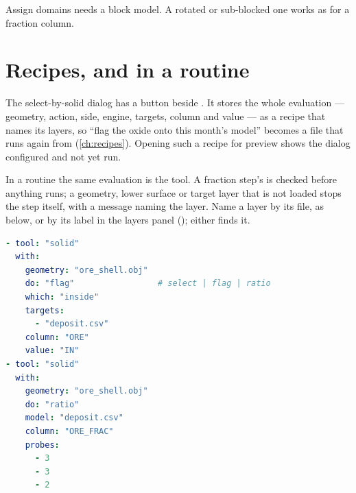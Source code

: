 \begin{note}
Assign domains needs a block model. A rotated or sub-blocked one works as for a fraction column.
\end{note}

\section{Recipes, and in a routine}\label{sec:geometry-routine}

The select-by-solid dialog has a  button beside . It stores the whole evaluation — geometry, action, side, engine, targets, column and value — as a recipe that names its layers, so “flag the oxide onto this month's model” becomes a file that runs again from  (\cref{ch:recipes}). Opening such a recipe for preview shows the dialog configured and not yet run.

In a routine the same evaluation is the  tool. A fraction step's  is checked before anything runs; a geometry, lower surface or target layer that is not loaded stops the step itself, with a message naming the layer. Name a layer by its file, as  below, or by its label in the layers panel (); either finds it.

\begin{lstlisting}[language=yaml]
- tool: "solid"
  with:
    geometry: "ore_shell.obj"
    do: "flag"                 # select | flag | ratio
    which: "inside"
    targets:
      - "deposit.csv"
    column: "ORE"
    value: "IN"
- tool: "solid"
  with:
    geometry: "ore_shell.obj"
    do: "ratio"
    model: "deposit.csv"
    column: "ORE_FRAC"
    probes:
      - 3
      - 3
      - 2
\end{lstlisting}

